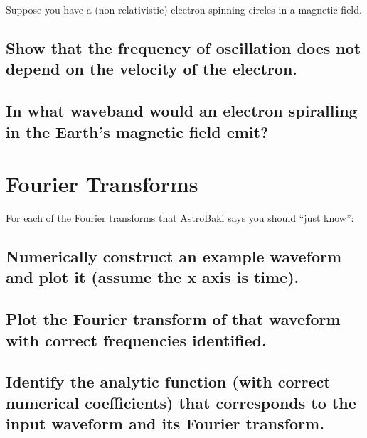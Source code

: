 \documentclass[11pt]{article}
\begin{document}
Suppose you have a (non-relativistic) electron spinning circles in a magnetic field.

\subsection{Show that the frequency of oscillation does not depend on the velocity of the electron.}
\vspace{0.25in}
\subsection{In what waveband would an electron spiralling in the Earth's magnetic field emit?}
\vspace{0.25in}

\section{Fourier Transforms}

For each of the Fourier transforms that AstroBaki says you should ``just know'':

\subsection{Numerically construct an example waveform and plot it (assume the x axis is time).}
\vspace{0.25in}
\subsection{Plot the Fourier transform of that waveform with correct frequencies identified.}
\vspace{0.25in}
\subsection{Identify the analytic function (with correct numerical coefficients) that corresponds to
the input waveform and its Fourier transform.}
\vspace{0.25in}
\end{document}
